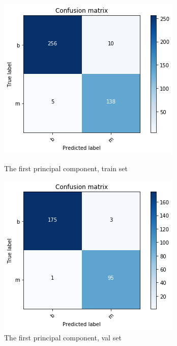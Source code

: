 \documentclass[11pt,a4paper]{article}
\begin{document}
\begin{enumerate}
\begin{enumerate}
	\begin{figure}[H]\centering
		\begin{minipage}{0.49\textwidth}
			\includegraphics[width=\linewidth]{figures/conf_train_pca_1.png}
			\caption{The first principal component, train set}\label{fig:conf_train_pca_1.png}
		\end{minipage}
		\begin{minipage}{0.49\textwidth}
		\includegraphics[width=\linewidth]{figures/conf_val_pca_1.png}
		\caption{The first principal component, val set}\label{fig:conf_val_pca_1.png}
		\end{minipage}
	\end{figure}		
		

\end{enumerate}
\end{enumerate}
\end{document}
